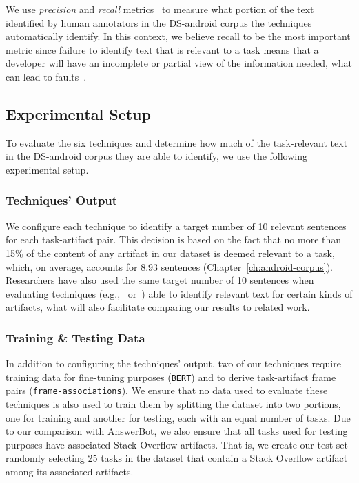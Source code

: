 




We use \textit{precision} and \textit{recall} metrics~\cite{manning2010IR} to measure what portion of the text identified by human annotators in the \acs{DS-android} corpus the techniques automatically identify.
In this context, we believe recall to be the most important metric since failure to identify text that is relevant to a task means that a developer will have an incomplete or partial view of the information needed,
what can lead to faults~\cite{Murphy2005}.




\subsection{Experimental Setup}

To evaluate the six techniques and determine how much of the task-relevant text in the \acs{DS-android} corpus they are able to identify, we use the following experimental setup.

\subsubsection{Techniques' Output}


We configure each technique to identify a target number of 10 relevant sentences for each task-artifact pair.
This decision is based on the fact that no more than 15\% of the content of any artifact in our dataset is deemed relevant to a task, which, on average, accounts for 8.93 sentences (Chapter~\ref{ch:android-corpus}).
Researchers have also used the same target number of 10 sentences when evaluating techniques  (e.g.,~\cite{Xu2017} or~\cite{Lotufo2012}) able to identify relevant text for certain kinds of artifacts, what will also facilitate comparing our results to related work.


\subsubsection{Training \& Testing Data}


In addition to configuring the techniques' output, two of our techniques require training data for fine-tuning purposes (\texttt{BERT}) and to derive task-artifact frame pairs (\texttt{frame-associations}).
We ensure that no data used to evaluate these techniques is also used to train them by 
splitting the dataset into two portions, one for training and another for testing, each with an equal number of tasks.
Due to our comparison with AnswerBot, we also ensure that all tasks used for testing purposes have associated Stack Overflow artifacts.
That is, we create our test set randomly selecting 25 tasks in the dataset that contain a 
Stack Overflow artifact among its associated artifacts.


